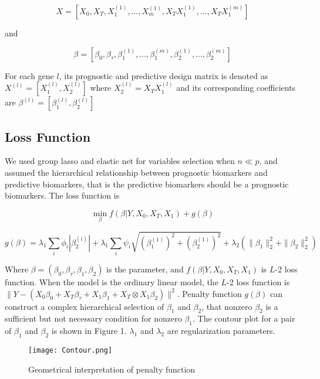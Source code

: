 \documentclass[12pt]{article}
\begin{document}
\begin{equation}
X=[X_0,X_T,X_1^{(1)},\dots,X_m^{(1)},X_TX_1^{(1)},\dots,X_TX_1^{(m)}]
\end{equation}

and 

\begin{equation}
\beta=[\beta_0,\beta_\tau,\beta_1^{(1)},\dots,\beta_1^{(m)},\beta_2^{(1)},\dots,\beta_2^{(m)}]
\end{equation}

For each gene $l$, its prognostic and predictive design matrix is denoted as $X^{(l)}=[X_1^{(l)},X_2^{(l)}]$ where $X_2^{(l)}=X_TX_1^{(l)}$ and its corresponding coefficients are $\beta^{(l)}=[\beta_1^{(l)},\beta_2^{(l)}]$

\subsection{Loss Function}

We used group lasso and elastic net for variables selection when $n\ll p$, and assumed the hierarchical relationship between prognostic biomarkers and predictive biomarkers, that is the predictive biomarkers should be a prognostic biomarkers. The loss function is 

\begin{equation} \label{loss}
\min_{\beta} f(\beta|Y,X_0,X_T,X_1) + g(\beta)
\end{equation}

\begin{equation} \label{penalty}
g(\beta)=\lambda_1\sum_i\phi_i|\beta_2^{(i)}|+\lambda_1\sum_i\psi_i\sqrt{(\beta_1^{(1)})^2+(\beta_2^{(1)})^2}+\lambda_2(\parallel\beta_1\parallel_2^2+\parallel\beta_2\parallel_2^2)
\end{equation}

Where $\beta=(\beta_0,\beta_\tau,\beta_1,\beta_2)$ is the parameter, and $f(\beta|Y,X_0,X_T,X_1) $ is $L$-2 loss function. When the model is the ordinary linear model, the $L$-2 loss function is $\parallel Y-(X_0\beta_0 + X_T\beta_\tau + X_1\beta_1+ X_T\otimes X_1 \beta_2) \parallel^2$. Penalty function $g(\beta)$ can construct a complex hierarchical selection of $\beta_1$ and $\beta_2$, that nonzero $\beta_2$ is a sufficient but not necessary condition for nonzero $\beta_1$. The contour plot for a pair of $\beta_1$ and $\beta_2$ is shown in Figure 1. $\lambda_1$ and $\lambda_2$ are regularization parameters.

\begin{figure}[t]
\texttt{[image: Contour.png]}
\centering
\caption{Geometrical interpretation of penalty function}
\end{figure}
\end{document}

